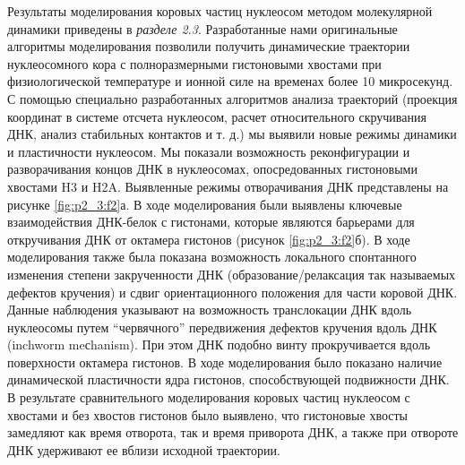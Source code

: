 Результаты  моделирования коровых частиц нуклеосом методом молекулярной динамики приведены в \textit{разделе 2.3}. Разработанные нами оригинальные алгоритмы моделирования позволили получить динамические траектории нуклеосомного кора с полноразмерными гистоновыми хвостами при физиологической температуре и ионной силе на временах более 10 микросекунд. 
 С помощью специально разработанных алгоритмов анализа траекторий (проекция координат в системе отсчета нуклеосом, расчет относительного скручивания ДНК, анализ стабильных контактов и т. д.) мы выявили новые режимы динамики и пластичности нуклеосом. Мы показали возможность реконфигурации и разворачивания концов ДНК в нуклеосомах, опосредованных гистоновыми хвостами H3 и H2A. Выявленные режимы отворачивания ДНК представлены на рисунке \ref{fig:p2_3:f2}а. В ходе моделирования были выявлены ключевые взаимодействия ДНК-белок с гистонами, которые являются барьерами для откручивания ДНК от октамера гистонов (рисунок \ref{fig:p2_3:f2}б). В ходе моделирования также была показана возможность локального спонтанного изменения степени закрученности ДНК (образование/релаксация так называемых дефектов кручения) и сдвиг ориентационного положения для части коровой ДНК. Данные наблюдения указывают на возможность транслокации ДНК вдоль нуклеосомы путем ``червячного'' передвижения дефектов кручения вдоль ДНК (inchworm meсhanism). При этом ДНК подобно винту прокручивается вдоль поверхности октамера гистонов. В ходе моделирования было показано наличие динамической пластичности ядра гистонов, способствующей подвижности ДНК. В результате сравнительного моделирования коровых частиц нуклеосом с хвостами и без хвостов гистонов было выявлено, что гистоновые хвосты замедляют как время отворота, так и время приворота ДНК, а также при отвороте ДНК удерживают ее вблизи исходной траектории. 
 

